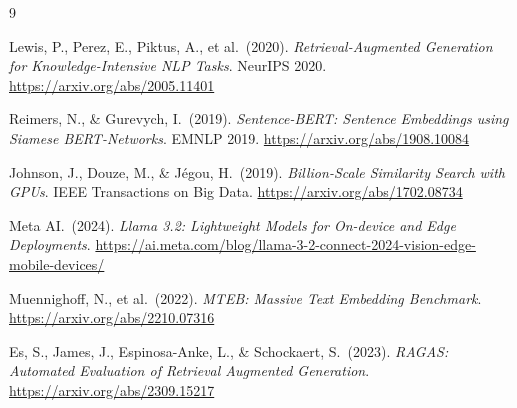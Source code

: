\documentclass[12pt,a4paper]{article}
\begin{document}
\begin{thebibliography}{9}

Lewis, P., Perez, E., Piktus, A., et al.\ (2020).
\textit{Retrieval-Augmented Generation for Knowledge-Intensive NLP Tasks}.
NeurIPS 2020.
\url{https://arxiv.org/abs/2005.11401}

Reimers, N., \& Gurevych, I.\ (2019).
\textit{Sentence-BERT: Sentence Embeddings using Siamese BERT-Networks}.
EMNLP 2019.
\url{https://arxiv.org/abs/1908.10084}

Johnson, J., Douze, M., \& J{\'e}gou, H.\ (2019).
\textit{Billion-Scale Similarity Search with GPUs}.
IEEE Transactions on Big Data.
\url{https://arxiv.org/abs/1702.08734}

Meta AI.\ (2024).
\textit{Llama 3.2: Lightweight Models for On-device and Edge Deployments}.
\url{https://ai.meta.com/blog/llama-3-2-connect-2024-vision-edge-mobile-devices/}

Muennighoff, N., et al.\ (2022).
\textit{MTEB: Massive Text Embedding Benchmark}.
\url{https://arxiv.org/abs/2210.07316}

Es, S., James, J., Espinosa-Anke, L., \& Schockaert, S.\ (2023).
\textit{RAGAS: Automated Evaluation of Retrieval Augmented Generation}.
\url{https://arxiv.org/abs/2309.15217}

\end{thebibliography}
\end{document}
